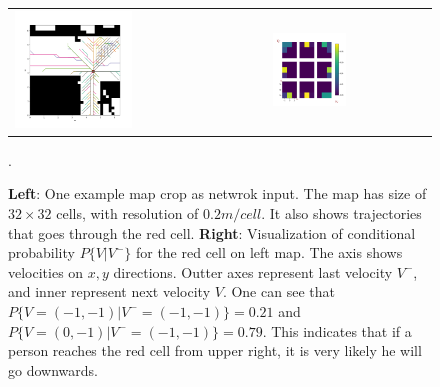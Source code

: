 %

\begin{figure}[h]
\begin{tabular}{ll}
\includegraphics[width=0.48\textwidth]{figures/trajs_through_cell.png}
&
\includegraphics[width=0.48\textwidth]{figures/probs_on_that_cell.png}
\end{tabular}
\caption{\textbf{Left}: One example map crop as netwrok input. The map has size of \( 32 \times 32 \) cells, with resolution of \( 0.2m/cell\). It also shows trajectories that goes through the red cell. \textbf{Right}: Visualization of conditional probability \( P\{V | V^-\} \) for the red cell on left map. The axis shows velocities on \( x, y\) directions. Outter axes represent last velocity \( V^- \), and inner represent next velocity \( V \). One can see that \( P\{V=(-1, -1) | V^-=(-1, -1)\} = 0.21 \) and \( P\{V=(0, -1) | V^-=(-1, -1)\} = 0.79 \). This indicates that if a person reaches the red cell from upper right, it is very likely he will go downwards. }. 
\label{fig:trajs}
\end{figure}

